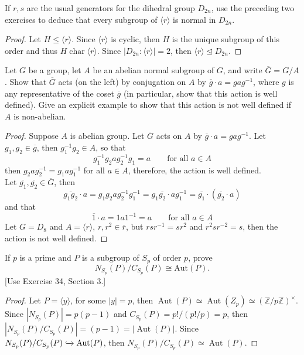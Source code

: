\documentclass{article}
\newcommand{\Z}{\mathbb{Z}}
\newenvironment{problem}[2][Problem]{\begin{trivlist}
\item[\hskip \labelsep {\bfseries #1}\hskip \labelsep {\bfseries #2.}]}{\end{trivlist}}
\DeclareMathOperator{\Aut}{Aut}
\DeclareMathOperator{\Char}{char}
\begin{document}
\begin{problem}{9}
     If $r, s$ are the usual generators for the dihedral group $D_{2n}$, use the preceding two exercises to deduce that every subgroup of $\langle r \rangle$ is normal in $D_{2n}$.
\end{problem}
\begin{proof}
    Let $H\leq \langle r \rangle$. Since $\langle r \rangle$ is cyclic, then $H$ is the unique subgroup of this order and thus $H \Char \langle r \rangle$. Since $|D_{2n}:\langle r \rangle|=2$, then $ \langle r \rangle \trianglelefteq D_{2n}$.
\end{proof}
\begin{problem}{10}
     Let $G$ be a group, let $A$ be an abelian normal subgroup of $G$, and write $\overline{G} = G / A$. Show that $\overline{G}$ acts (on the left) by conjugation on $A$ by $\overline{g} \cdot a = gag^{-1}$, where $g$ is any representative of the coset $\overline{g}$ (in particular, show that this action is well defined). Give an explicit example to show that this action is not well defined if $A$ is non-abelian.
\end{problem}
\begin{proof}
    Suppose $A$ is abelian group. Let $\overline {G}$ acts on $A$ by $\overline{g} \cdot a =g a g^{-1}$. 
    Let $g_1, g_2 \in \overline{g}$, then $g_1^{-1}g_2\in A$, so that 
    \[
        g_1^{-1}g_2 a g_2^{-1}g_1=a \qquad\text{for all } a \in A
    \]
    then $g_2 a g_2^{-1}=g_1ag_1^{-1} $ for all $a \in A$, therefore, the action is well defined.\\
    Let $\overline{g_1}, \overline{g_2}\in \overline{G}$, then
    \[
        \overline{g_1g_2}\cdot a =g_1g_2a g_2^{-1}g_1^{-1}=g_1\overline{g_2}\cdot a g_1^{-1}=\overline{g_1}\cdot(\overline{g_2}\cdot a) 
    \]
    and that 
    \[
    \overline{1}\cdot a =1 a 1^{-1}=a \qquad \text{for all }a \in A
    \]
    Let $G=D_{8}$ and $A=\langle r \rangle$, $r, r^2 \in \overline{r}$, but $rsr^{-1}=sr^{2}$ and $r^2s r^{-2}= s$, then the action is not well defined.
\end{proof}
\begin{problem}{11}
    If $p$ is a prime and $P$ is a subgroup of $S_p$ of order $p$, prove 
\[
N_{S_p}(P) / C_{S_p}(P) \cong \text{Aut}(P).
\]
[Use Exercise 34, Section 3.]
\end{problem}
\begin{proof}
Let $P=\langle y \rangle$, for some $|y|=p$, then $\Aut(P)\simeq \Aut(Z_p) \simeq (\Z/p\Z)^{\times}$.
    Since $|N_{S_p}(P)|=p(p-1)$ and $C_{S_p}(P)=p!/(p!/p)=p$, then $|N_{S_p}(P)/C_{S_p}(P)|=(p-1)=|\Aut(P)|$. Since $N_{S_p}(P)/C_{S_p}(P)\xhookrightarrow{} \Aut(P)$, then $N_{S_p}(P)/C_{S_p}(P) \simeq \Aut(P)$.
\end{proof}
\end{document}
